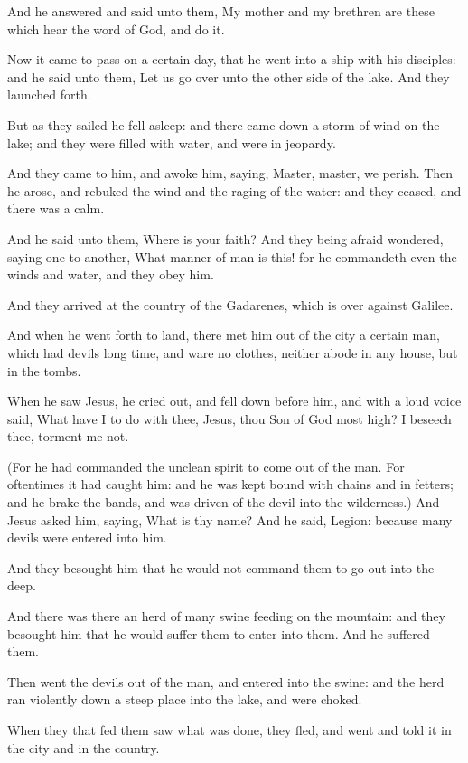 \Verse And he answered and said unto them, My mother and my brethren are these which hear the word of God, and do it.

\Verse Now it came to pass on a certain day, that he went into a ship with his disciples: and he said unto them, Let us go over unto the other side of the lake. And they launched forth.

\Verse But as they sailed he fell asleep: and there came down a storm of wind on the lake; and they were filled with water, and were in jeopardy.

\Verse And they came to him, and awoke him, saying, Master, master, we perish. Then he arose, and rebuked the wind and the raging of the water: and they ceased, and there was a calm.

\Verse And he said unto them, Where is your faith? And they being afraid wondered, saying one to another, What manner of man is this! for he commandeth even the winds and water, and they obey him.

\Verse And they arrived at the country of the Gadarenes, which is over against Galilee.

\Verse And when he went forth to land, there met him out of the city a certain man, which had devils long time, and ware no clothes, neither abode in any house, but in the tombs.

\Verse When he saw Jesus, he cried out, and fell down before him, and with a loud voice said, What have I to do with thee, Jesus, thou Son of God most high? I beseech thee, torment me not.

\Verse (For he had commanded the unclean spirit to come out of the man.  For oftentimes it had caught him: and he was kept bound with chains and in fetters; and he brake the bands, and was driven of the devil into the wilderness.)  \Verse And Jesus asked him, saying, What is thy name? And he said, Legion: because many devils were entered into him.

\Verse And they besought him that he would not command them to go out into the deep.

\Verse And there was there an herd of many swine feeding on the mountain: and they besought him that he would suffer them to enter into them. And he suffered them.

\Verse Then went the devils out of the man, and entered into the swine: and the herd ran violently down a steep place into the lake, and were choked.

\Verse When they that fed them saw what was done, they fled, and went and told it in the city and in the country.

